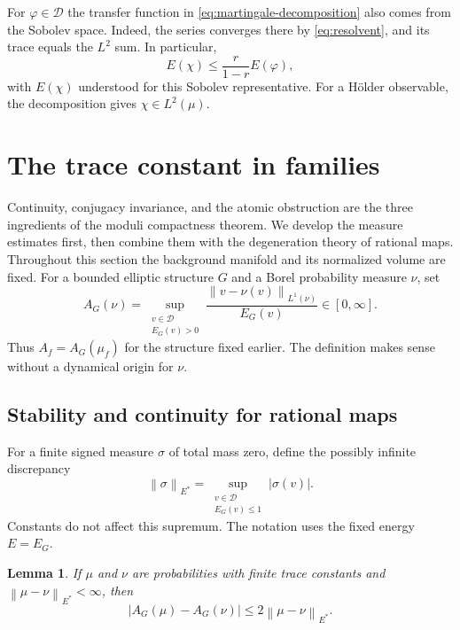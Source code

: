 \documentclass[11pt,reqno]{amsart}
\theoremstyle{plain}
\newtheorem{lemma}[theorem]{Lemma}
\theoremstyle{definition}
\theoremstyle{remark}
\newcommand{\E}{\mathbb E}
\newcommand{\Dcal}{\mathcal D}
\newcommand{\norm}[1]{\left\lVert #1\right\rVert}
\numberwithin{equation}{section}
\begin{document}
For $\varphi\in\Dcal$ the transfer function in \eqref{eq:martingale-decomposition} also comes from the Sobolev space. Indeed, the series converges there by \eqref{eq:resolvent}, and its trace equals the $L^2$ sum. In particular,
\[
 E(\chi)\le\frac{r}{1-r}E(\varphi),
\]
with $E(\chi)$ understood for this Sobolev representative. For a H\"older observable, the decomposition gives $\chi\in L^2(\mu)$.

\section{The trace constant in families}\label{sec:families}

Continuity, conjugacy invariance, and the atomic obstruction are the three ingredients of the moduli compactness theorem. We develop the measure estimates first, then combine them with the degeneration theory of rational maps. Throughout this section the background manifold and its normalized volume are fixed. For a bounded elliptic structure $G$ and a Borel probability measure $\nu$, set
\begin{equation}\label{eq:measure-trace-constant}
 A_G(\nu)=\sup_{\substack{v\in\Dcal\\E_G(v)>0}}
 \frac{\norm{v-\nu(v)}_{L^1(\nu)}}{E_G(v)}\in[0,\infty].
\end{equation}
Thus $A_f=A_G(\mu_f)$ for the structure fixed earlier. The definition makes sense without a dynamical origin for $\nu$.

\subsection{Stability and continuity for rational maps}

For a finite signed measure $\sigma$ of total mass zero, define the possibly infinite discrepancy
\[
 \norm{\sigma}_{E^*}
 =\sup_{\substack{v\in\Dcal\\E_G(v)\le1}}|\sigma(v)|.
\]
Constants do not affect this supremum. The notation uses the fixed energy $E=E_G$.

\begin{lemma}\label{lem:trace-stability}
If $\mu$ and $\nu$ are probabilities with finite trace constants and $\norm{\mu-\nu}_{E^*}<\infty$, then
\begin{equation}\label{eq:trace-stability}
 |A_G(\mu)-A_G(\nu)|\le2\norm{\mu-\nu}_{E^*}.
\end{equation}
\end{lemma}
\end{document}
